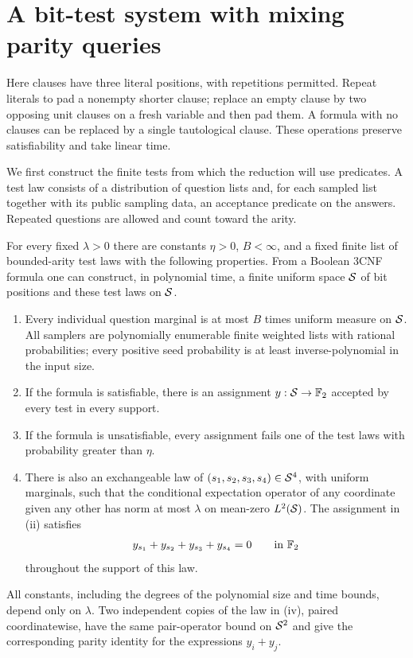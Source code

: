 \section{A bit-test system with mixing parity queries}\label{sec:bit-tests}

Here clauses have three literal positions, with repetitions permitted.
Repeat literals to pad a nonempty shorter clause; replace an empty clause
by two opposing unit clauses on a fresh variable and then pad them.
A formula with no clauses can be replaced by a single tautological clause.
These operations preserve satisfiability and take linear time.

We first construct the finite tests from which the reduction will use
predicates. A test law consists of a distribution of question lists and,
for each sampled list together with its public sampling data, an
acceptance predicate on the answers. Repeated questions are allowed and
count toward the arity.

\begin{theorem}\label{thm:bit-test-system}
For every fixed $\lambda>0$ there are constants $\eta>0$, $B<\infty$,
and a fixed finite list of bounded-arity test laws with the following
properties. From a Boolean $3$CNF formula one can construct, in
polynomial time, a finite uniform space $\mathcal S$ of bit positions and these
test laws on $\mathcal S$.
\begin{enumerate}[label=\textup{(\roman*)}]
\item Every individual question marginal is at most $B$ times uniform
measure on $\mathcal S$. All samplers are polynomially enumerable finite
weighted lists with rational probabilities; every positive seed
probability is at least inverse-polynomial in the input size.
\item If the formula is satisfiable, there is an assignment
$y:\mathcal S\to\mathbb F_2$ accepted by every test in every support.
\item If the formula is unsatisfiable, every assignment fails one of
the test laws with probability greater than $\eta$.
\item There is also an exchangeable law of
$(s_1,s_2,s_3,s_4)\in\mathcal S^4$, with uniform marginals, such that the
conditional expectation operator of any coordinate given any other has
norm at most $\lambda$ on mean-zero $L^2(\mathcal S)$. The assignment in
\textup{(ii)} satisfies
\[
 y_{s_1}+y_{s_2}+y_{s_3}+y_{s_4}=0
 \qquad\text{in }\mathbb F_2
\]
throughout the support of this law.
\end{enumerate}
All constants, including the degrees of the polynomial size and time
bounds, depend only on $\lambda$. Two independent copies of the law in
\textup{(iv)}, paired coordinatewise, have the same pair-operator bound
on $\mathcal S^2$ and give the corresponding parity identity for the expressions
$y_i+y_j$.
\end{theorem}

